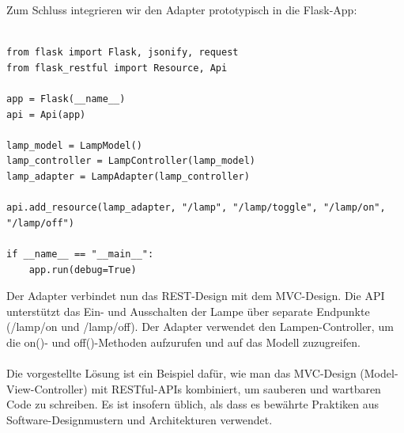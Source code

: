 \documentclass[../vs-script-first-v01.tex]{subfiles}
\begin{document}
Zum Schluss integrieren wir den Adapter prototypisch in die Flask-App:\\\\
\begin{lstlisting}[caption={Lamp REST APP},captionpos=b,label={lst:lamp_r}]
from flask import Flask, jsonify, request
from flask_restful import Resource, Api

app = Flask(__name__)
api = Api(app)

lamp_model = LampModel()
lamp_controller = LampController(lamp_model)
lamp_adapter = LampAdapter(lamp_controller)

api.add_resource(lamp_adapter, "/lamp", "/lamp/toggle", "/lamp/on", "/lamp/off")

if __name__ == "__main__":
    app.run(debug=True)
\end{lstlisting}
Der Adapter verbindet nun das REST-Design mit dem MVC-Design. Die API unterstützt das Ein- und Ausschalten der Lampe über separate Endpunkte (/lamp/on und /lamp/off). Der Adapter verwendet den Lampen-Controller, um die on()- und off()-Methoden aufzurufen und auf das Modell zuzugreifen.
\\\\
Die vorgestellte Lösung ist ein Beispiel dafür, wie man das MVC-Design (Model-View-Controller) mit RESTful-APIs kombiniert, um sauberen und wartbaren Code zu schreiben. Es ist insofern üblich, als dass es bewährte Praktiken aus Software-Designmustern und Architekturen verwendet.
\end{document}
